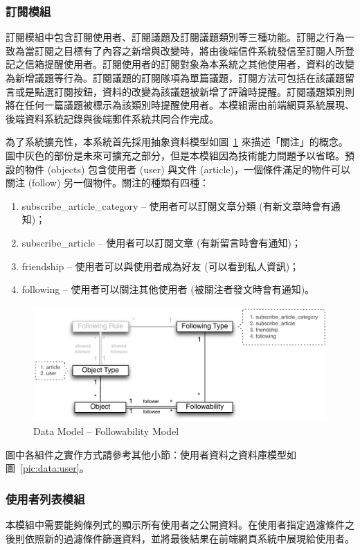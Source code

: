 \subsubsection{訂閱模組}
訂閱模組中包含訂閱使用者、訂閱議題及訂閱議題類別等三種功能。訂閱之行為一致為當訂閱之目標有了內容之新增與改變時，將由後端信件系統發信至訂閱人所登記之信箱提醒使用者。訂閱使用者的訂閱對象為本系統之其他使用者，資料的改變為新增議題等行為。訂閱議題的訂閱隊項為單篇議題，訂閱方法可包括在該議題留言或是點選訂閱按鈕，資料的改變為該議題被新增了評論時提醒。訂閱議題類別則將在任何一篇議題被標示為該類別時提醒使用者。本模組需由前端網頁系統展現、後端資料系統記錄與後端郵件系統共同合作完成。

為了系統擴充性，本系統首先採用抽象資料模型如圖~\ref{pic:data:followability} 來描述「關注」的概念。圖中灰色的部份是未來可擴充之部分，但是本模組因為技術能力問題予以省略。預設的物件 (objects) 包含使用者 (user) 與文件 (article)，一個條件滿足的物件可以關注 (follow) 另一個物件。關注的種類有四種：
\begin{enumerate}
\item{subscribe\_article\_category -- 使用者可以訂閱文章分類 (有新文章時會有通知)；}
\item{subscribe\_article -- 使用者可以訂閱文章 (有新留言時會有通知)；}
\item{friendship -- 使用者可以與使用者成為好友 (可以看到私人資訊)；}
\item{following -- 使用者可以關注其他使用者 (被關注者發文時會有通知)。}
\end{enumerate}

\begin{figure}[H]
\centering
\includegraphics[width=\textwidth]{img/followability_real.pdf}
\caption{Data Model -- Followability Model}
\label{pic:data:followability}
\end{figure}

圖中各組件之實作方式請參考其他小節：使用者資料之資料庫模型如圖~\ref{pic:data:user}。 

\subsubsection{使用者列表模組}
本模組中需要能夠條列式的顯示所有使用者之公開資料。在使用者指定過濾條件之後則依照新的過濾條件篩選資料，並將最後結果在前端網頁系統中展現給使用者。

